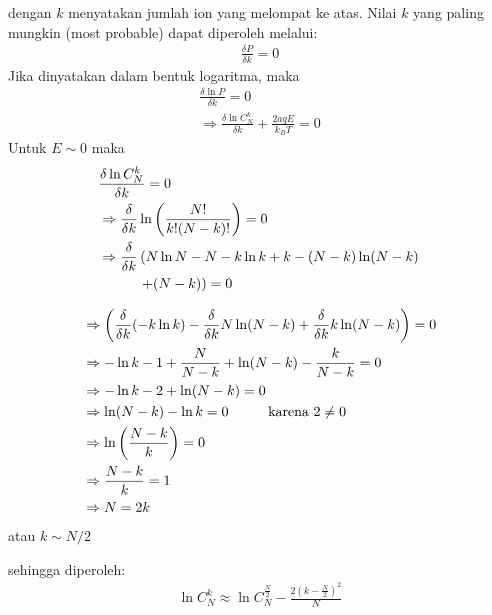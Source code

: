 \documentclass[t]{beamer}
\begin{document}
\begin{frame}

dengan $k$ menyatakan jumlah ion yang melompat ke atas. Nilai $k$ yang paling mungkin (most probable) dapat diperoleh melalui:
\begin{align}
\frac{\delta P}{\delta k} =  0 
\end{align}
Jika dinyatakan dalam bentuk logaritma, maka
\begin{eqnarray}
 \frac{\delta \ln P}{\delta k} = 0  \label{nilai k 11 } \nonumber \\
 \Rightarrow \frac{\delta \ln C_N^k }{\delta k } + \frac{2aqE}{k_B T}  = 0  \label{pers 10}
\end{eqnarray}
Untuk $E\sim 0$ maka 
\begin{align}
& \frac{\delta \ln C_N^k }{\delta k} = 0 \nonumber \\
& \Rightarrow \frac{\delta}{\delta k} \ln \left( \frac{N !}{k ! (N- k )!}\right) = 0 \nonumber \\
&  \Rightarrow  \frac{\delta }{\delta k}\left( N \ln N - N - k \ln k + k - (N - k ) \ln (N - k) \right.  \nonumber \\
& \hspace{1 cm}\left. + (N- k)  \right) = 0 \label{identitas 0}
\end{align}
\end{frame}
\begin{frame}
\begin{align}
&\Rightarrow \left( \frac{\delta}{\delta k} ( - k \ln k )   - \frac{\delta}{\delta k} N \ln (N - k) + \frac{\delta }{\delta k} k \ln (N-k)  \right) = 0 \nonumber \\
& \Rightarrow - \ln k  - 1 + \frac{N}{N - k} + \ln (N - k) - \frac{k}{N- k } = 0 \nonumber\\
&\Rightarrow - \ln  k  - 2 + \ln (N - k) = 0 \nonumber \\
&\Rightarrow \ln (N - k ) - \ln k = 0 \hspace{1 cm } \text{karena } 2 \ne 0 \label{identitas 1} \\
&\Rightarrow \ln \left( \frac{N- k}{k}\right) = 0 \nonumber \\
&\Rightarrow \frac{N - k}{k} = 1 \nonumber \\
& \Rightarrow N = 2 k 
\end{align}
atau $k \sim N/2 $

sehingga diperoleh: 
\begin{align}
\boxed{\ln C_N^k  \approx  \ln C_N^{\frac{N}{2}}  - \frac{2 (k - \frac{N}{2})^2}{N}  } \label{aprrox stirling	}
\end{align}

\end{frame}
\end{document}
